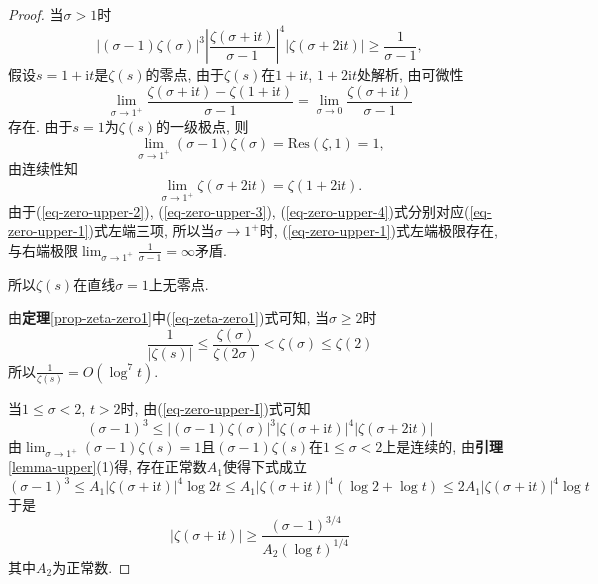 \documentclass[12pt, a4paper, oneside]{ctexart}
\numberwithin{equation}{section}  %
\let\leq=\leqslant %
\let\geq=\geqslant %
\def\i{\mathrm{i}}          %
\def\res{\mathrm{Res}}      %
\def\add{\vspace{1ex}}      %
\begin{document}
\begin{proof}
    当$\sigma > 1$时
    \begin{equation}\label{eq-zero-upper-1}
        |(\sigma-1)\zeta(\sigma)|^3\left|\frac{\zeta(\sigma+\i t)}{\sigma - 1}\right|^4|\zeta(\sigma+2\i t)|\geq\frac{1}{\sigma -1},
    \end{equation}
    假设$s=  1+\i t$是$\zeta(s)$的零点, 由于$\zeta(s)$在$1+\i t$, $1+2\i t$处解析, 由可微性
    \begin{equation}\label{eq-zero-upper-2}
        \lim_{\sigma\to1^+}\frac{\zeta(\sigma+\i t)-\zeta(1+\i t)}{\sigma -1} = \lim_{\sigma\to0}\frac{\zeta(\sigma+\i t)}{\sigma - 1}
    \end{equation}
    存在. 由于$s=1$为$\zeta(s)$的一级极点, 则
    \begin{equation}\label{eq-zero-upper-3}
        \lim_{\sigma\to1^+}(\sigma - 1)\zeta(\sigma) = \res(\zeta, 1) =1,
    \end{equation}
    由连续性知
    \begin{equation}\label{eq-zero-upper-4}
        \lim_{\sigma\to1^+}\zeta(\sigma+2\i t)=\zeta(1+2\i t).
    \end{equation}
    由于(\ref{eq-zero-upper-2}), (\ref{eq-zero-upper-3}), (\ref{eq-zero-upper-4})式分别对应(\ref{eq-zero-upper-1})式左端三项, 所以当$\sigma\to  1^+$时\add, (\ref{eq-zero-upper-1})式左端极限存在, 与右端极限$\lim_{\sigma\to1^+}\frac{1}{\sigma-1}=\infty$矛盾.\add

    所以$\zeta(s)$在直线$\sigma =1$上无零点.

    由\textbf{定理}\ref{prop-zeta-zero1}中(\ref{eq-zeta-zero1})式可知, 当$\sigma \geq 2$时
    \begin{equation*}
        \frac{1}{|\zeta(s)|}\leq \frac{\zeta(\sigma)}{\zeta(2\sigma)} < \zeta(\sigma)\leq \zeta(2)
    \end{equation*}
    所以$\frac{1}{\zeta(s)} = O(\log^7 t)$.\add

    当$1\leq \sigma < 2$, $t > 2$时, 由(\ref{eq-zero-upper-I})式可知
    \begin{equation*}
        (\sigma - 1)^3\leq |(\sigma - 1)\zeta(\sigma)|^3|\zeta(\sigma+\i t)|^4|\zeta(\sigma+2\i t)|
    \end{equation*}
    由$\lim_{\sigma\to 1^+}(\sigma - 1)\zeta(s) = 1$且$(\sigma - 1)\zeta(s)$在$1\leq \sigma < 2$上是连续的, 由\textbf{引理}\ref{lemma-upper}(1)得, 存在正常数$A_1$使得下式成立
    \begin{equation*}
        (\sigma - 1)^3\leq A_1|\zeta(\sigma+\i t)|^4\log 2t\leq A_1|\zeta(\sigma+\i t)|^4(\log 2+\log t)\leq 2A_1|\zeta(\sigma+\i t)|^4\log t
    \end{equation*}
    于是
    \begin{equation}\label{eq-zero-upper-6}
        |\zeta(\sigma+\i t)|\geq \frac{(\sigma-1)^{3/4}}{A_2(\log t)^{1/4}}
    \end{equation}
    其中$A_2$为正常数.


\end{proof}
\end{document}
